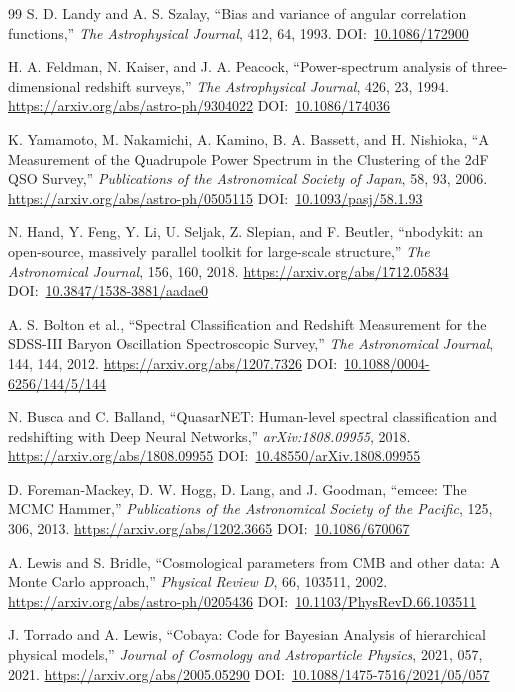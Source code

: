 \documentclass[10pt,onecolumn]{article}
\newcommand{\doi}[1]{DOI:~\href{https://doi.org/#1}{#1}}
\begin{document}
\begin{thebibliography}{99}
S. D. Landy and A. S. Szalay,
``Bias and variance of angular correlation functions,''
\emph{The Astrophysical Journal}, 412, 64, 1993.
\doi{10.1086/172900}

H. A. Feldman, N. Kaiser, and J. A. Peacock,
``Power-spectrum analysis of three-dimensional redshift surveys,''
\emph{The Astrophysical Journal}, 426, 23, 1994.
\url{https://arxiv.org/abs/astro-ph/9304022}
\doi{10.1086/174036}

K. Yamamoto, M. Nakamichi, A. Kamino, B. A. Bassett, and H. Nishioka,
``A Measurement of the Quadrupole Power Spectrum in the Clustering of the 2dF QSO Survey,''
\emph{Publications of the Astronomical Society of Japan}, 58, 93, 2006.
\url{https://arxiv.org/abs/astro-ph/0505115}
\doi{10.1093/pasj/58.1.93}

N. Hand, Y. Feng, Y. Li, U. Seljak, Z. Slepian, and F. Beutler,
``nbodykit: an open-source, massively parallel toolkit for large-scale structure,''
\emph{The Astronomical Journal}, 156, 160, 2018.
\url{https://arxiv.org/abs/1712.05834}
\doi{10.3847/1538-3881/aadae0}

A. S. Bolton et al.,
``Spectral Classification and Redshift Measurement for the SDSS-III Baryon Oscillation Spectroscopic Survey,''
\emph{The Astronomical Journal}, 144, 144, 2012.
\url{https://arxiv.org/abs/1207.7326}
\doi{10.1088/0004-6256/144/5/144}

N. Busca and C. Balland,
``QuasarNET: Human-level spectral classification and redshifting with Deep Neural Networks,''
\emph{arXiv:1808.09955}, 2018.
\url{https://arxiv.org/abs/1808.09955}
\doi{10.48550/arXiv.1808.09955}

D. Foreman-Mackey, D. W. Hogg, D. Lang, and J. Goodman,
``emcee: The MCMC Hammer,''
\emph{Publications of the Astronomical Society of the Pacific}, 125, 306, 2013.
\url{https://arxiv.org/abs/1202.3665}
\doi{10.1086/670067}

A. Lewis and S. Bridle,
``Cosmological parameters from CMB and other data: A Monte Carlo approach,''
\emph{Physical Review D}, 66, 103511, 2002.
\url{https://arxiv.org/abs/astro-ph/0205436}
\doi{10.1103/PhysRevD.66.103511}

J. Torrado and A. Lewis,
``Cobaya: Code for Bayesian Analysis of hierarchical physical models,''
\emph{Journal of Cosmology and Astroparticle Physics}, 2021, 057, 2021.
\url{https://arxiv.org/abs/2005.05290}
\doi{10.1088/1475-7516/2021/05/057}


\end{thebibliography}
\end{document}
